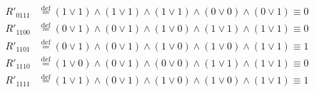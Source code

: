 \documentclass{article}
\newcommand*{\defeq}{\stackrel{\text{def}}{=}}
\begin{document}
\begin{align*}
	R'_{0111} & \defeq (1 \lor 1) \land (1 \lor 1) \land (1 \lor 1) \land (0 \lor 0) \land (0 \lor 1) \equiv 0                              \\
	R'_{1100} & \defeq (0 \lor 1) \land (0 \lor 1) \land (1 \lor 0) \land (1 \lor 1) \land (1 \lor 1) \equiv 0                              \\
	R'_{1101} & \defeq (0 \lor 1) \land (0 \lor 1) \land (1 \lor 0) \land (1 \lor 0) \land (1 \lor 1) \equiv 1                              \\
	R'_{1110} & \defeq (1 \lor 0) \land (0 \lor 1) \land (0 \lor 0) \land (1 \lor 1) \land (1 \lor 1) \equiv 0                              \\
	R'_{1111} & \defeq (1 \lor 1) \land (0 \lor 1) \land (1 \lor 0) \land (1 \lor 0) \land (1 \lor 1) \equiv 1                              \\
\end{align*}
\end{document}
